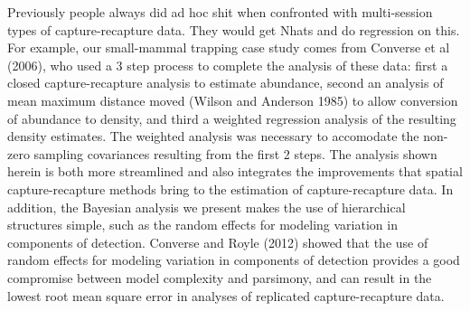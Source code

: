 Previously people always did ad hoc shit when confronted with
multi-session types of capture-recapture data. They would get Nhats
and do regression on this. For example, 
our small-mammal trapping case study comes from 
Converse et al (2006), who used
a 3 step process to complete the analysis of these data: first a
closed capture-recapture analysis to estimate abundance, second an
analysis of mean maximum distance moved (Wilson and Anderson 1985) to
allow conversion of abundance to density, and third a weighted
regression analysis of the  resulting density estimates. The
weighted analysis was necessary to accomodate the non-zero sampling
covariances resulting from the first 2 steps. The analysis shown
herein is both more streamlined and also integrates the improvements
that spatial capture-recapture methods bring to the estimation of
capture-recapture data. In addition, the Bayesian analysis we present
makes the use of hierarchical structures simple, such as the random effects
for modeling variation in components of detection. Converse
and Royle (2012) showed that the use of random effects for modeling
variation in components of detection provides a good compromise
between model complexity and parsimony, and can result in the lowest root
mean square error in analyses of replicated capture-recapture data.









